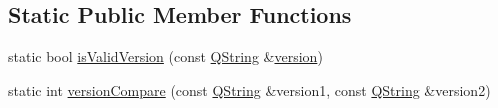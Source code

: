 \subsection*{\-Static \-Public \-Member \-Functions}
\begin{DoxyCompactItemize}
\item 
static bool \hyperlink{class_extension_system_1_1_internal_1_1_plugin_spec_private_a7233cda395b9d7ee44734541958ee82c}{is\-Valid\-Version} (const \hyperlink{group___u_a_v_objects_plugin_gab9d252f49c333c94a72f97ce3105a32d}{\-Q\-String} \&\hyperlink{class_extension_system_1_1_internal_1_1_plugin_spec_private_a00cf7a310301d427a56b1b23576289bc}{version})
\item 
static int \hyperlink{class_extension_system_1_1_internal_1_1_plugin_spec_private_a9b2b47f08743b4cb4dc977755390959a}{version\-Compare} (const \hyperlink{group___u_a_v_objects_plugin_gab9d252f49c333c94a72f97ce3105a32d}{\-Q\-String} \&version1, const \hyperlink{group___u_a_v_objects_plugin_gab9d252f49c333c94a72f97ce3105a32d}{\-Q\-String} \&version2)
\end{DoxyCompactItemize}
